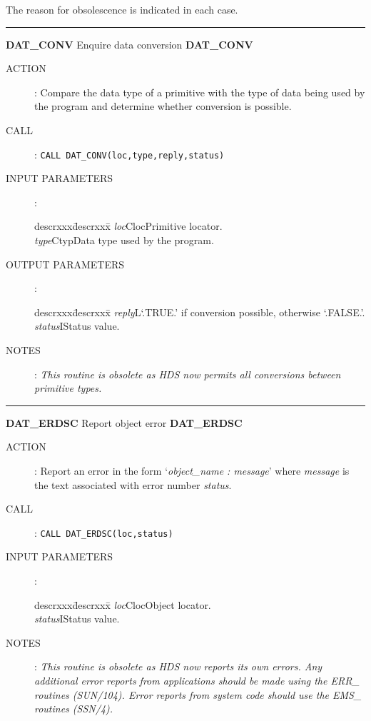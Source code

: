 The reason for obsolescence is indicated in each case.

\small
\rule{\textwidth}{0.3mm}
{\Large {\bf DAT\_CONV} \hfill Enquire data conversion \hfill {\bf DAT\_CONV}}
\begin{description}
\item [ACTION]:
Compare the data type of a primitive with the type of data being used by the
program and determine whether conversion is possible.
\item [CALL]:
{\tt CALL DAT\_CONV(loc,type,reply,status)}
\item [INPUT PARAMETERS]:
\begin{tabbing}
descrxxx\=descrxxx\=\kill
{\em loc}\>Cloc\>Primitive locator.\\
{\em type}\>Ctyp\>Data type used by the program.
\end{tabbing}
\item [OUTPUT PARAMETERS]:
\begin{tabbing}
descrxxx\=descrxxx\=\kill
{\em reply}\>L\>`.TRUE.' if conversion possible, otherwise `.FALSE.'.\\
{\em status}\>I\>Status value.
\end{tabbing}
\item [NOTES]:
{\em This routine is obsolete as HDS now permits all conversions between
primitive types.}
\end{description}
\goodbreak

\rule{\textwidth}{0.3mm}
{\Large {\bf DAT\_ERDSC} \hfill Report object error \hfill {\bf DAT\_ERDSC}}
\begin{description}
\item [ACTION]:
Report an error in the form `{\em object\_name : message}' where {\em message}
is the text associated with error number {\em status}.
\item [CALL]:
{\tt CALL DAT\_ERDSC(loc,status)}
\item [INPUT PARAMETERS]:
\begin{tabbing}
descrxxx\=descrxxx\=\kill
{\em loc}\>Cloc\>Object locator.\\
{\em status}\>I\>Status value.
\end{tabbing}
\item [NOTES]:
{\em This routine is obsolete as HDS now reports its own errors. Any additional
error reports from applications should be made using the ERR\_ routines
(SUN/104). Error reports from system code should use the EMS\_ routines
(SSN/4).}
\end{description}
\newpage

